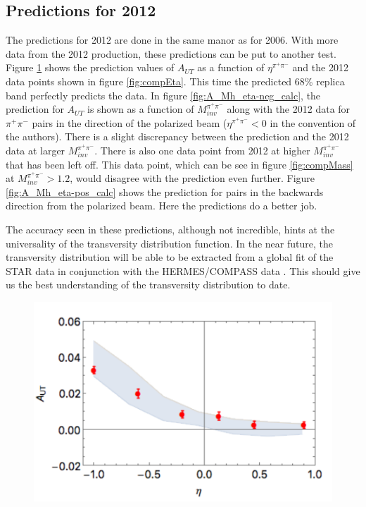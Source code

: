\documentclass[abstract = on,listof=totoc, bibliography=totoc]{scrreprt}
\newcommand{\mpair}{M_{inv}^{\pi^+\pi^-}}
\newcommand{\etapair}{\eta^{\pi^+\pi^-}}
\newcommand{\pip}{\pi^+}
\newcommand{\pim}{\pi^-}
\newcommand{\pair}{$\pip\pim$ }
\begin{document}
\FloatBarrier
\subsection{Predictions for 2012}

The predictions for 2012 are done in the same manor as for 2006. With more data from the 2012 production, these predictions can be put to another test. Figure \ref{fig:A_eta_calc} shows the prediction values of $A_{UT}$ as a function of $\etapair$ and the 2012 data points shown in figure \ref{fig:compEta}. This time the predicted 68\% replica band perfectly predicts the data. In figure \ref{fig:A_Mh_eta-neg_calc}, the prediction for $A_{UT}$ is shown as a function of $\mpair$ along with the 2012 data for \pair pairs in the direction of the polarized beam ($\etapair < 0$ in the convention of the authors). There is a slight discrepancy between the prediction and the 2012 data at larger $\mpair$. There is also one data point from 2012 at higher $\mpair$ that has been left off. This data point, which can be see in figure \ref{fig:compMass} at $\mpair > 1.2$, would disagree with the prediction even further. Figure \ref{fig:A_Mh_eta-pos_calc} shows the prediction for pairs in the backwards direction from the polarized beam. Here the predictions do a better job.    

The accuracy seen in these predictions, although not incredible, hints at the universality of the transversity distribution function. In the near future, the transversity distribution will be able to be extracted from a global fit of the STAR data in conjunction with the HERMES/COMPASS data \cite{univTrans}. This should give us the best understanding of the transversity distribution to date.  




\begin{figure}
\begin{center}
\includegraphics[width = .6\textwidth]{A_eta}
\caption[]{}
\label{fig:A_eta_calc}
\end{center}
\end{figure}
\end{document}
